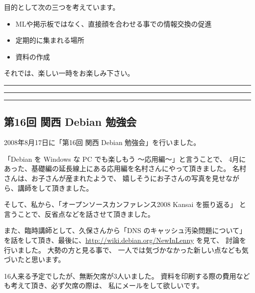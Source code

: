 \documentclass[mingoth,a4paper]{jsarticle}
\begin{document}
 目的として次の三つを考えています。
 \begin{itemize}
  \item MLや掲示板ではなく、直接顔を合わせる事での情報交換の促進
  \item 定期的に集まれる場所
  \item 資料の作成
 \end{itemize}

 それでは、楽しい一時をお楽しみ下さい。

\newpage

\begin{minipage}[b]{0.2\hsize}
 {}
\end{minipage}
\begin{minipage}[b]{0.8\hsize}
\hrule
\vspace{2mm}
\hrule
\setcounter{tocdepth}{1}
\tableofcontents
\vspace{2mm}
\hrule
\end{minipage}


\subsection{第16回 関西 Debian 勉強会}

2008年8月17日に「第16回 関西 Debian 勉強会」を行いました。

「Debian を Windows な PC でも楽しもう 〜応用編〜」と言うことで、
4月にあった、基礎編の延長線上にある応用編を名村さんにやって頂きました。
名村さんは、お子さんが産まれたようで、
嬉しそうにお子さんの写真を見せながら、講師をして頂きました。

そして、私から、「オープンソースカンファレンス2008 Kansai を振り返る」
と言うことで、反省点などを話させて頂きました。

また、臨時講師として、久保さんから「DNS のキャッシュ汚染問題について」
を話をして頂き、最後に、\url{http://wiki.debian.org/NewInLenny} を見て、
討論を行いました。
大勢の方と見る事で、
一人では気づかなかった新しい点なども気づいたと思います。

16人来る予定でしたが、無断欠席が3人いました。
資料を印刷する際の費用なども考えて頂き、必ず欠席の際は、
私にメールをして欲しいです。

\label{sec:ubiquity}

\end{document}
